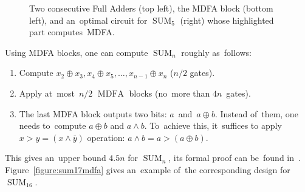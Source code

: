 \documentclass[sigconf, review, anonymous]{acmart}
\DeclareMathOperator{\SUM}{SUM}
\DeclareMathOperator{\MDFA}{MDFA}
\begin{document}
\begin{figure}
\begin{center}
    \end{center}
    \caption{Two consecutive Full Adders (top left), the MDFA block (bottom left), and an~optimal circuit for $\SUM_5$ (right) whose highlighted part computes~MDFA.}
    \label{figure:mdfa}
\end{figure}

Using MDFA blocks, one can compute $\SUM_n$ roughly as~follows:
\begin{enumerate}
    \item Compute $x_2 \oplus x_3, x_4 \oplus x_5, \dotsc, x_{n-1} \oplus x_n$ ($n/2$ gates).
    \item Apply at~most~$n/2$ $\MDFA$ blocks (no~more than $4n$~gates).
    \item The last MDFA block outputs two bits: $a$~and~$a\oplus b$. Instead of~them, one needs to~compute $a \oplus b$ and $a \land b$. To~achieve this,
    it~suffices to apply $x>y=(x \land \overline{y})$ operation:
    \(a \land b = a>(a \oplus b)\).
\end{enumerate}
This gives an~upper bound $4.5n$ for $\SUM_n$, its formal proof can
be~found in~\cite{DBLP:journals/ipl/DemenkovKKY10}. Figure~\ref{figure:sum17mdfa} gives an~example of~the corresponding design
for~$\SUM_{16}$.
\end{document}
